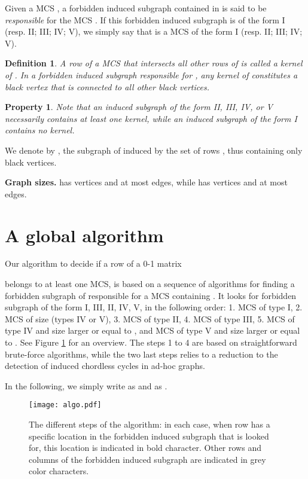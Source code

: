 \documentclass{article}
\newtheorem{definition}{Definition}
\newtheorem{property}{Property}
\begin{document}
Given a MCS , a forbidden induced subgraph 
contained in  
 is said to be \emph{responsible} for the MCS 
. 
If this forbidden induced subgraph is of the form I (resp. II; III; IV; V), 
we simply say that  is a MCS of the form I (resp. II; III; IV; V).

\begin{definition}
A row of a MCS   that intersects all other rows of 
is called a \emph{kernel} of . In a forbidden  induced subgraph  
responsible for , any kernel of  constitutes a  black 
vertex that is connected to all other  black vertices.
\label{def-kernel}
\end{definition}

\begin{property}
Note that an induced subgraph of the form II, III, IV, or V necessarily contains
at least one kernel, while an induced subgraph of the form I contains no kernel.
\label{mcs-kernel}
\end{property}

We denote by , the subgraph of  induced by the set of rows 
, thus containing only black vertices.

\noindent
{\bf Graph sizes.}  has  vertices and at most  
edges, while   has  vertices and at most  
edges.

\section{A global algorithm}

Our algorithm to decide if a row  of a 0-1 matrix 

belongs to at least one MCS, is based on a sequence of algorithms for finding 
a forbidden subgraph of  responsible for a MCS 
containing . It looks for forbidden subgraph of the form I, III, II, IV, V, 
in the following order: 1. MCS of type I, 2. MCS of size  (types IV or V),
3. MCS of type II, 4. MCS of type III, 5. MCS of type IV and size larger or 
equal to , and MCS of type V and size larger or equal to . See Figure  
\ref{Algo}  for an overview. The steps 1 to 4 are based on straightforward 
brute-force algorithms, while the two last steps relies to a reduction to the 
detection of induced chordless cycles in ad-hoc graphs.

In the following, we simply write 
 as  and  as .

\begin{figure}[htb]
  \centering
\texttt{[image: algo.pdf]}
\caption{The different steps of the algorithm: in each case, when row  has 
a specific location in the forbidden induced subgraph that is looked for, this 
location is indicated in bold character. Other rows and columns of the 
forbidden induced subgraph are indicated in grey color characters.}
 \label{Algo}
\end{figure}
\end{document}
